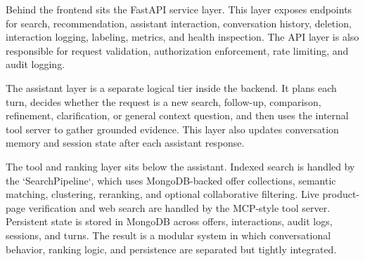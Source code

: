 \documentclass[12pt,a4paper,oneside]{report}
\begin{document}
Behind the frontend sits the FastAPI service layer. This layer exposes endpoints for search, recommendation, assistant interaction, conversation history, deletion, interaction logging, labeling, metrics, and health inspection. The API layer is also responsible for request validation, authorization enforcement, rate limiting, and audit logging.

The assistant layer is a separate logical tier inside the backend. It plans each turn, decides whether the request is a new search, follow-up, comparison, refinement, clarification, or general context question, and then uses the internal tool server to gather grounded evidence. This layer also updates conversation memory and session state after each assistant response.

The tool and ranking layer sits below the assistant. Indexed search is handled by the `SearchPipeline`, which uses MongoDB-backed offer collections, semantic matching, clustering, reranking, and optional collaborative filtering. Live product-page verification and web search are handled by the MCP-style tool server. Persistent state is stored in MongoDB across offers, interactions, audit logs, sessions, and turns. The result is a modular system in which conversational behavior, ranking logic, and persistence are separated but tightly integrated.
\end{document}
